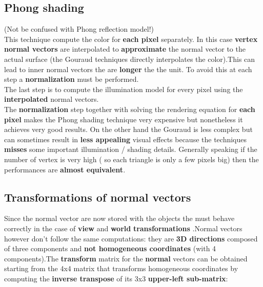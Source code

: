 \subsection{Phong shading}
(Not be confused with Phong reflection model!)\\
This technique compute the color for \textbf{each pixel} separately. In this case \textbf{vertex normal vectors} are interpolated to \textbf{approximate}  the normal vector to the actual surface (the Gouraud techniques directly interpolates the color).This can lead to inner normal vectors the are \textbf{longer} the the unit. To avoid this at each step a \textbf{normalization} must be performed.\\
The last step is to compute the illumination model for every pixel using the \textbf{interpolated} normal vectors.\\
The \textbf{normalization} step together with solving the rendering equation for \textbf{each pixel} makes the Phong shading technique very expensive but nonetheless it achieves very good results. On the other hand the Gouraud is less complex but can sometimes result in \textbf{less appealing} visual effects because the techniques \textbf{misses} some important illumination / shading details. Generally speaking if the number of vertex is very high ( so each triangle is only a few pixels big) then the performances are \textbf{almost equivalent}.

\subsection{Transformations of normal vectors}
Since the normal vector are now stored with the objects the must behave correctly in the case of \textbf{view} and \textbf{world} \textbf{transformations} .Normal vectors however  don't follow the same computations: they are \textbf{3D directions}
composed of three components  and \textbf{not homogeneous coordinates} (with 4 components).The \textbf{transform} matrix for the \textbf{normal} vectors can be obtained starting from the 4x4 matrix that transforms homogeneous coordinates by computing the \textbf{inverse transpose} of its 3x3 \textbf{upper-left sub-matrix}:
 